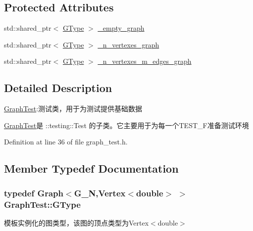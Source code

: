 \subsection*{Protected Attributes}
\begin{DoxyCompactItemize}
\item 
std\+::shared\+\_\+ptr$<$ \hyperlink{class_graph_test_a35200ea3d08690769c40550cba2ecd5a}{G\+Type} $>$ \hyperlink{class_graph_test_a1dbaf4ba93fa17246e6fef78b5dd678c}{\+\_\+empty\+\_\+graph}
\item 
std\+::shared\+\_\+ptr$<$ \hyperlink{class_graph_test_a35200ea3d08690769c40550cba2ecd5a}{G\+Type} $>$ \hyperlink{class_graph_test_a2dac828599509e577b5406d06f613a16}{\+\_\+n\+\_\+vertexes\+\_\+graph}
\item 
std\+::shared\+\_\+ptr$<$ \hyperlink{class_graph_test_a35200ea3d08690769c40550cba2ecd5a}{G\+Type} $>$ \hyperlink{class_graph_test_aaa662e57a6eb46a91c59464871b4907f}{\+\_\+n\+\_\+vertexes\+\_\+m\+\_\+edges\+\_\+graph}
\end{DoxyCompactItemize}


\subsection{Detailed Description}
\hyperlink{class_graph_test}{Graph\+Test}\+:测试类，用于为测试提供基础数据 

{\ttfamily \hyperlink{class_graph_test}{Graph\+Test}}是 {\ttfamily \+::testing\+::\+Test} 的子类。它主要用于为每一个{\ttfamily T\+E\+S\+T\+\_\+\+F}准备测试环境 

Definition at line 36 of file graph\+\_\+test.\+h.



\subsection{Member Typedef Documentation}
\hypertarget{class_graph_test_a35200ea3d08690769c40550cba2ecd5a}{}
\subsubsection[{G\+Type}]{\setlength{\rightskip}{0pt plus 5cm}typedef {\bf Graph}$<$G\+\_\+\+N,{\bf Vertex}$<$double$>$ $>$ {\bf Graph\+Test\+::\+G\+Type}}\label{class_graph_test_a35200ea3d08690769c40550cba2ecd5a}
模板实例化的图类型，该图的顶点类型为{\ttfamily Vertex$<$double$>$} 

